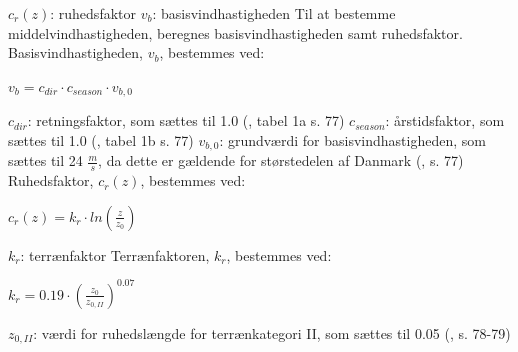 $c_r(z)$: ruhedsfaktor
\newline
$v_b$: basisvindhastigheden
\newline
\newline
Til at bestemme middelvindhastigheden, beregnes basisvindhastigheden samt ruhedsfaktor.
\newline
\newline
Basisvindhastigheden, $v_b$, bestemmes ved:
\begin{center}
$v_b=c_{dir}\cdot c_{season}\cdot v_{b,0}$
\end{center}
$c_{dir}$: retningsfaktor, som sættes til 1.0 (\citep{EU91}, tabel 1a s. 77)
\newline
$c_{season}$: årstidsfaktor, som sættes til 1.0 (\citep{EU91}, tabel 1b s. 77)
\newline
$v_{b,0}$: grundværdi for basisvindhastigheden, som sættes til 24 $\frac{m}{s}$, da dette er gældende for størstedelen af Danmark (\citep{EU91}, s. 77)
\newline
\newline
Ruhedsfaktor, $c_r(z)$, bestemmes ved:
\begin{center}
$c_r(z)=k_r\cdot ln(\frac{z}{z_0})$
\end{center}
$k_r$: terrænfaktor
\newline
\newline
Terrænfaktoren, $k_r$, bestemmes ved:
\begin{center}
$k_r=0.19\cdot (\frac{z_0}{z_{0,II}})^{0.07}$
\end{center}
$z_{0,II}$: værdi for ruhedslængde for terrænkategori II, som sættes til 0.05 (\citep{EU91}, s. 78-79)

